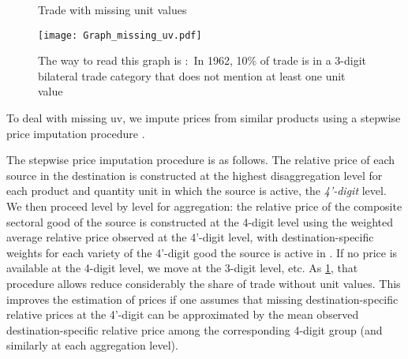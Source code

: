 \documentclass[12pt,twoside,a4paper,notitlepage]{article}
\begin{document}
\begin{figure}
\caption{Trade with missing unit values}
\texttt{[image: Graph\_missing\_uv.pdf]}
\label{fig:missing_uv}
\caption*{The way to read this graph is : In 1962, 10\% of trade is in a 3-digit bilateral trade category that does not mention at least one unit value}
\end{figure}




To deal with missing uv, we impute prices from similar products using a stepwise price imputation procedure
.

The stepwise price imputation procedure is as follows. The relative price of each source in the destination is constructed at the highest disaggregation level for each product and quantity unit in which the source is active, the \textit{4'-digit} level. We then proceed level by level for aggregation: the relative price of the composite sectoral good of the source is constructed at the 4-digit level using the weighted average relative price observed at the 4'-digit level, with destination-specific weights for each variety of the 4'-digit good the source is active in%
. If no price is available at the 4-digit level, we move at the 3-digit level, etc. As \ref{fig:missing_uv}, that procedure allows reduce considerably the share of trade without unit values. This improves the estimation of prices if one assumes that missing destination-specific relative prices at the 4'-digit can be approximated by the mean observed destination-specific relative price among the corresponding 4-digit group (and similarly at each aggregation level). 
\end{document}
